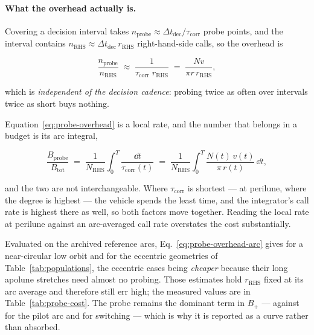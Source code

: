 \paragraph{What the overhead actually is.} Covering a decision interval takes
$n_{\mathrm{probe}}\approx\Delta t_{\mathrm{dec}}/\tau_{\mathrm{corr}}$ probe
points, and the interval contains $n_{\mathrm{RHS}}\approx
\Delta t_{\mathrm{dec}}\,r_{\mathrm{RHS}}$ right-hand-side calls, so the
overhead is

\begin{equation}
  \frac{n_{\mathrm{probe}}}{n_{\mathrm{RHS}}}
  \;\approx\; \frac{1}{\tau_{\mathrm{corr}}\;r_{\mathrm{RHS}}}
  \;=\; \frac{N v}{\pi r\, r_{\mathrm{RHS}}} ,
  \label{eq:probe-overhead}
\end{equation}

which is \emph{independent of the decision cadence}: probing twice as often
over intervals twice as short buys nothing.

Equation~\eqref{eq:probe-overhead} is a local rate, and the number that belongs
in a budget is its arc integral,

\begin{equation}
  \frac{B_{\mathrm{probe}}}{B_{\mathrm{tot}}}
  \;=\; \frac{1}{N_{\mathrm{RHS}}}\int_0^T \frac{\dd t}{\tau_{\mathrm{corr}}(t)}
  \;=\; \frac{1}{N_{\mathrm{RHS}}}\int_0^T
        \frac{N(t)\,v(t)}{\pi\,r(t)}\,\dd t ,
  \label{eq:probe-overhead-arc}
\end{equation}

and the two are not interchangeable. Where $\tau_{\mathrm{corr}}$ is shortest
--- at perilune, where the degree is highest --- the vehicle spends the least
time, and the integrator's call rate is highest there as well, so both factors
move together. Reading the local rate at perilune against an arc-averaged call
rate overstates the cost substantially.

Evaluated on the archived reference arcs, Eq.~\eqref{eq:probe-overhead-arc}
gives  for a near-circular low orbit and  for the eccentric
geometries of Table~\ref{tab:populations}, the eccentric cases being
\emph{cheaper} because their long apolune stretches need almost no probing.
Those estimates hold $r_{\mathrm{RHS}}$ fixed at its arc average and therefore
still err high; the measured values are in
Table~\ref{tab:probe-cost}. The probe remains the dominant term in $B_+$
--- against  for the pilot arc and  for switching --- which is
why it is reported as a curve rather than absorbed.

